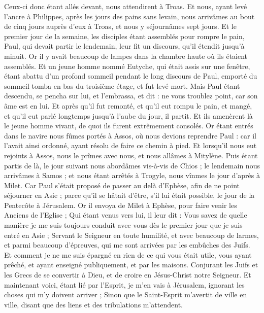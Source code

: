 \begin{multicols}{2}
Ceux-ci donc étant allés devant, nous attendirent à Troas.
Et nous, ayant levé l'ancre à Philippes, après les jours des pains sans levain, nous arrivâmes au bout de cinq jours auprès d'eux à Troas, et nous y séjournâmes sept jours.
Et le premier jour de la semaine, les disciples étant assemblés pour rompre le pain, Paul, qui devait partir le lendemain, leur fit un discours, qu'il étendit jusqu'à minuit.
Or il y avait beaucoup de lampes dans la chambre haute où ils étaient assemblés.
Et un jeune homme nommé Eutyche, qui était assis sur une fenêtre, étant abattu d'un profond sommeil pendant le long discours de Paul, emporté du sommeil tomba en bas du troisième étage, et fut levé mort.
Mais Paul étant descendu, se pencha sur lui, et l'embrassa, et dit : ne vous troublez point, car son âme est en lui.
Et après qu'il fut remonté, et qu'il eut rompu le pain, et mangé, et qu'il eut parlé longtemps jusqu'à l'aube du jour, il partit.
Et ils amenèrent là le jeune homme vivant, de quoi ils furent extrêmement consolés.
Or étant entrés dans le navire nous fûmes portés à Assos, où nous devions reprendre Paul : car il l'avait ainsi ordonné, ayant résolu de faire ce chemin à pied.
Et lorsqu'il nous eut rejoints à Assos, nous le prîmes avec nous, et nous allâmes à Mitylène.
Puis étant partis de là, le jour suivant nous abordâmes vis-à-vis de Chios ; le lendemain nous arrivâmes à Samos ; et nous étant arrêtés à Trogyle, nous vînmes le jour d'après à Milet.
Car Paul s'était proposé de passer au delà d'Ephèse, afin de ne point séjourner en Asie ; parce qu'il se hâtait d'être, s'il lui était possible, le jour de la Pentecôte à Jérusalem.
Or il envoya de Milet à Ephèse, pour faire venir les Anciens de l'Eglise ;
Qui étant venus vers lui, il leur dit : Vous savez de quelle manière je me suis toujours conduit avec vous dès le premier jour que je suis entré en Asie ;
Servant le Seigneur en toute humilité, et avec beaucoup de larmes, et parmi beaucoup d'épreuves, qui me sont arrivées par les embûches des Juifs.
Et comment je ne me suis épargné en rien de ce qui vous était utile, vous ayant prêché, et ayant enseigné publiquement, et par les maisons.
Conjurant les Juifs et les Grecs de se convertir à Dieu, et de croire en Jésus-Christ notre Seigneur.
Et maintenant voici, étant lié par l'Esprit, je m'en vais à Jérusalem, ignorant les choses qui m'y doivent arriver ;
Sinon que le Saint-Esprit m'avertit de ville en ville, disant que des liens et des tribulations m'attendent.

\end{multicols}
